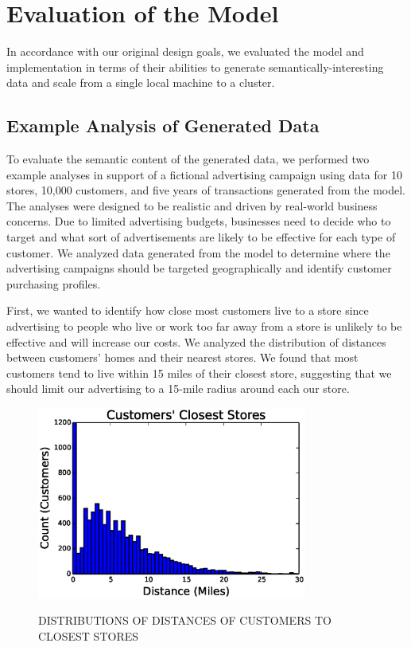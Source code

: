 \section{Evaluation of the Model}
In accordance with our original design goals, we evaluated the model and implementation in terms of their abilities to generate semantically-interesting data and scale from a single local machine to a cluster.

\subsection{Example Analysis of Generated Data}
To evaluate the semantic content of the generated data, we performed two example analyses in support of a fictional advertising campaign using data for 10 stores, 10,000 customers, and five years of transactions generated from the model. The analyses were designed to be realistic and driven by real-world business concerns.  Due to limited advertising budgets, businesses need to decide who to target and what sort of advertisements are likely to be effective for each type of customer.  We analyzed data generated from the model to determine where the advertising campaigns should be targeted geographically and identify customer purchasing profiles.

First, we wanted to identify how close most customers live to a store since advertising to people who live or work too far away from a store is unlikely to be effective and will increase our costs. We analyzed the distribution of distances between customers' homes and their nearest stores.  We found that most customers tend to live within 15 miles of their closest store, suggesting that we should limit our advertising to a 15-mile radius around each our store.

\begin{figure}[!t]
  \centering
  \caption{\uppercase{Distributions of Distances of Customers to Closest Stores}}
  \includegraphics[width=3.5in]{figures/bigpetstore/customer_store_distances.eps}
  \label{fig:cluster_analysis}
\end{figure}

